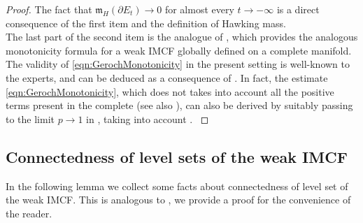 \documentclass[a4paper,12pt,reqno]{amsart}
\numberwithin{equation}{section}
\theoremstyle{plain}
\theoremstyle{definition}
\theoremstyle{remark}
\begin{document}
{\begin{proof}
{        The fact that $\mathfrak{m}_H(\partial E_t)\to 0$ for almost every $t\to-\infty$ is a direct consequence of the first item and the definition of Hawking mass.\\
        The last part of the second item is the analogue of \cite[Geroch Monotonicity Formula 5.8]{HuiskenIlmanen}, which provides the analogous monotonicity formula for a weak IMCF globally defined on a complete manifold. The validity of \eqref{eqn:GerochMonotonicity} in the present setting is well-known to the experts, and can be deduced as a consequence of \cite[Theorem 4.1]{BenattiPludaPozzetta}. In fact, the estimate \eqref{eqn:GerochMonotonicity}, which does not takes into account all the positive terms present in the complete \cite[Geroch Monotonicity Formula 5.8]{HuiskenIlmanen} (see also \cite[Theorem 5.5]{BenattiPludaPozzetta}), can also be derived by suitably passing to the limit $p\to 1$ in \cite[Theorem 2.11]{BenattiFogagnoloMazzieri23SIGMA}, taking into account \cite[Corollary 4.7, Corollary 4.8]{BenattiPludaPozzetta}.
        }
\end{proof}
    
        
    
    
    
    

\subsection{Connectedness of level sets of the weak IMCF}\label{sec:Connectedness}

In the following lemma we collect some facts about connectedness of level set of the weak IMCF.
This is analogous to \cite[Connectedness Lemma 4.2]{HuiskenIlmanen}, we provide a proof for the convenience of the reader.
    
}
\end{document}

